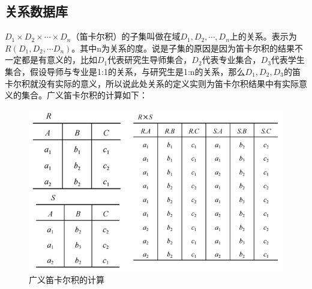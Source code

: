 \documentclass[chapter.computer_science.tex]{subfiles}
\begin{document}
\subsection{关系数据库}
$ D_1 \times D_2 \times \cdots \times D_n $（笛卡尔积）的子集叫做在域$ D_1, D_2, \cdots, D_n $上的关系。表示为$ R(D_1, D_2,\cdots D_n) $。其中n为关系的度。说是子集的原因是因为笛卡尔积的结果不一定都是有意义的，比如$ D_1 $代表研究生导师集合，$ D_2  $代表专业集合，$ D_3 $代表学生集合，假设导师与专业是1:1的关系，与研究生是1:n的关系，那么$ D_1, D_2, D_3 $的笛卡尔积就没有实际的意义，所以说此处关系的定义实则为笛卡尔积结果中有实际意义的集合。广义笛卡尔积的计算如下：\\
\begin{figure}[H]
    \centering
    \includegraphics[scale=0.25]{./images/0025.png}
    \caption{广义笛卡尔积的计算}
\end{figure}
\end{document}
